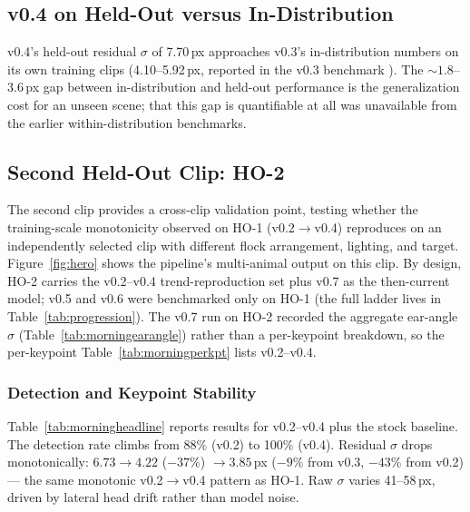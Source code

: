 \documentclass[11pt]{article}
\begin{document}
\subsection{v0.4 on Held-Out versus In-Distribution}
\label{sec:indist}
v0.4's held-out residual $\sigma$ of 7.70\,px approaches v0.3's in-distribution
numbers on its own training clips (4.10--5.92\,px, reported in the v0.3 benchmark
\citep{v03benchmark}). The ${\sim}1.8$--$3.6$\,px gap between in-distribution and
held-out performance is the generalization cost for an unseen scene; that this
gap is quantifiable at all was unavailable from the earlier within-distribution
benchmarks.

\subsection{Second Held-Out Clip: HO-2}
\label{sec:morning}
The second clip provides a cross-clip validation point, testing whether the
training-scale monotonicity observed on HO-1 (v0.2$\rightarrow$v0.4)
reproduces on an independently selected clip with different flock arrangement,
lighting, and target. Figure~\ref{fig:hero} shows the pipeline's multi-animal
output on this clip. By design, HO-2 carries the v0.2--v0.4 trend-reproduction
set plus v0.7 as the then-current model; v0.5 and v0.6 were benchmarked only on
HO-1 (the full ladder lives in Table~\ref{tab:progression}). The v0.7 run on HO-2
recorded the aggregate ear-angle $\sigma$ (Table~\ref{tab:morningearangle}) rather
than a per-keypoint breakdown, so the per-keypoint Table~\ref{tab:morningperkpt}
lists v0.2--v0.4.

\subsubsection{Detection and Keypoint Stability}
Table~\ref{tab:morningheadline} reports results for v0.2--v0.4 plus the stock
baseline. The detection rate climbs from 88\% (v0.2) to 100\% (v0.4). Residual
$\sigma$ drops monotonically: $6.73 \rightarrow 4.22$ ($-37\%$) $\rightarrow 3.85$\,px
($-9\%$ from v0.3, $-43\%$ from v0.2) --- the same monotonic v0.2$\rightarrow$v0.4
pattern as HO-1. Raw $\sigma$ varies 41--58\,px, driven by lateral head
drift rather than model noise.
\end{document}
